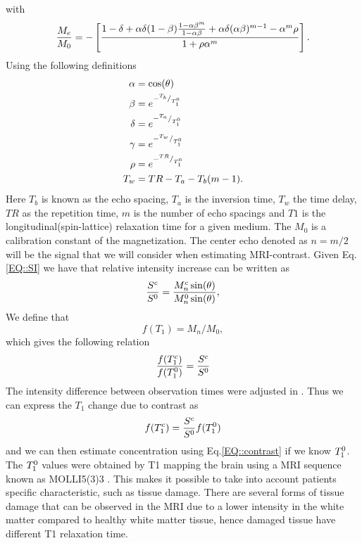 \documentclass[11pt,a4paper]{article}
\begin{document}
with 
\begin{equation}
\frac{M_{e}}{M_{0}} = - \left[ \frac{ 1 -\delta + \alpha \delta (1-\beta ) \frac{1-\alpha\beta\sp{m}}{1-\alpha \beta} + \alpha\delta(\alpha\beta)\sp{m-1} - \alpha\sp{m}\rho}{1 +\rho \alpha\sp{m} } \right].
\end{equation}
Using the following definitions
\begin{equation}
\begin{aligned}
\alpha &= \cos ( \theta ) \\
\beta  &= e\sp{- \sp{T_b}/_{T_1\sp{0}} } \\
\delta &= e\sp{- \sp{T_a}/_{T_1\sp{0}} } \\
\gamma &= e\sp{- \sp{T_w}/_{T_1\sp{0}} } \\
\rho   &= e\sp{- \sp{TR}/_{T_1\sp{0}}}  \\
T_w    &= TR - T_a -T_b(m-1)       .\\
\end{aligned}
\end{equation}
Here $T_b$ is known as the echo spacing, $T_a$ is the inversion time, $T_w$ the time delay, $TR$ as the repetition time, $m$ is the number of echo spacings and $T1$ is the longitudinal(spin-lattice) relaxation time for a given medium. The $M_0$ is a calibration constant of the magnetization. The center echo denoted as $n=m/2$ will be the signal that we will consider when estimating MRI-contrast. Given Eq.\ref{EQ::SI} we have that relative intensity increase can be written as 
\begin{equation}
\frac{S\sp{c}}{S\sp{0}} = \frac{ M_{n}\sp{c} \sin (\theta)}{ M_{n}\sp{0} \sin (\theta) } ,
\end{equation}
We define that  
\begin{equation}
f(T_1) = M_{n}/M_{0} ,
\label{Eq::F}
\end{equation}
which gives the following relation 
\begin{equation}
\frac{f(T_{1}\sp{c} ) }{f(T_{1}\sp{0})}  = \frac{S\sp{c}}{S\sp{0}} 
\end{equation}
The intensity difference between observation times were adjusted in \cite{eidevalnes}. Thus we can express the $T_1$ change due to contrast as 
\begin{equation}
f ( T_{1}\sp{c} ) = \frac{S\sp{c}}{S\sp{0}} f(T_{1}\sp{0}) 
\end{equation}
and we can then estimate concentration using Eq.\ref{EQ::contrast} if we know $T_{1}\sp{0}$. The $T_{1}\sp{0}$ values were obtained by T1 mapping the brain using a MRI sequence known as MOLLI5(3)3 \cite{TAYLOR201667}. This makes it possible to  take into account patients specific characteristic, such as tissue damage. There are several forms of tissue damage that can be observed in the MRI due to a lower intensity in the white matter compared to healthy white matter tissue, hence damaged tissue have different T1 relaxation time. 
\end{document}

